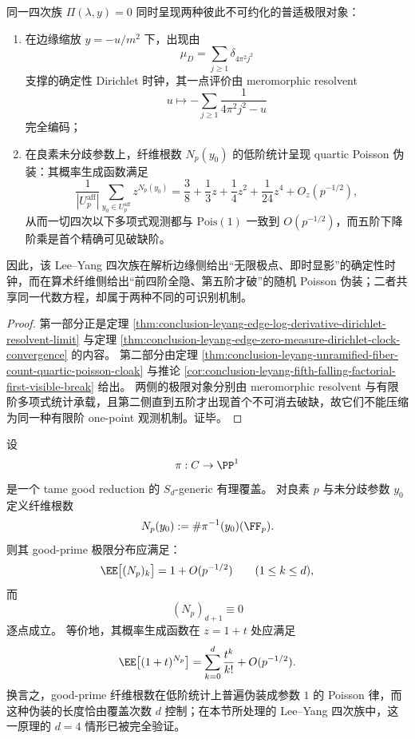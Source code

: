 \begin{theorem}\label{thm:conclusion-leyang-analytic-edge-arithmetic-fiber-dual-universality-split}
同一四次族 \(\Pi(\lambda,y)=0\) 同时呈现两种彼此不可约化的普适极限对象：
\begin{enumerate}
\item 在边缘缩放 \(y=-u/m^2\) 下，出现由
\[
\mu_D=\sum_{j\ge1}\delta_{4\pi^2j^2}
\]
支撑的确定性 Dirichlet 时钟，其一点评价由 meromorphic resolvent
\[
u\longmapsto -\sum_{j\ge1}\frac{1}{4\pi^2j^2-u}
\]
完全编码；
\item 在良素未分歧参数上，纤维根数 \(N_p(y_0)\) 的低阶统计呈现 quartic Poisson 伪装：其概率生成函数满足
\[
\frac{1}{|U_p^{\mathrm{aff}}|}\sum_{y_0\in U_p^{\mathrm{aff}}} z^{N_p(y_0)}
=
\frac38+\frac13 z+\frac14 z^2+\frac1{24}z^4+O_z(p^{-1/2}),
\]
从而一切四次以下多项式观测都与 \(\mathrm{Pois}(1)\) 一致到 \(O(p^{-1/2})\)，而五阶下降阶乘是首个精确可见破缺阶。
\end{enumerate}
因此，该 Lee--Yang 四次族在解析边缘侧给出“无限极点、即时显影”的确定性时钟，而在算术纤维侧给出“前四阶全隐、第五阶才破”的随机 Poisson 伪装；二者共享同一代数方程，却属于两种不同的可识别机制。
\end{theorem}
\begin{proof}
第一部分正是定理 \ref{thm:conclusion-leyang-edge-log-derivative-dirichlet-resolvent-limit} 与定理 \ref{thm:conclusion-leyang-edge-zero-measure-dirichlet-clock-convergence} 的内容。
第二部分由定理 \ref{thm:conclusion-leyang-unramified-fiber-count-quartic-poisson-cloak} 与推论 \ref{cor:conclusion-leyang-fifth-falling-factorial-first-visible-break} 给出。
两侧的极限对象分别由 meromorphic resolvent 与有限阶多项式统计承载，且第二侧直到五阶才出现首个不可消去破缺，故它们不能压缩为同一种有限阶 one-point 观测机制。证毕。
\end{proof}

\begin{conjecture}\label{conj:conclusion-leyang-degree-d-poisson-cloak-principle}
设
\[
\pi:C\to \PP^1
\]
是一个 tame good reduction 的 \(S_d\)-generic 有理覆盖。
对良素 \(p\) 与未分歧参数 \(y_0\) 定义纤维根数
\[
N_p(y_0):=\#\pi^{-1}(y_0)(\FF_p).
\]
则其 good-prime 极限分布应满足：
\[
\EE\bigl[(N_p)_k\bigr]=1+O(p^{-1/2})
\qquad (1\le k\le d),
\]
而
\[
(N_p)_{d+1}\equiv 0
\]
逐点成立。
等价地，其概率生成函数在 \(z=1+t\) 处应满足
\[
\EE\bigl[(1+t)^{N_p}\bigr]
=
\sum_{k=0}^{d}\frac{t^k}{k!}+O(p^{-1/2}).
\]
换言之，good-prime 纤维根数在低阶统计上普遍伪装成参数 \(1\) 的 Poisson 律，而这种伪装的长度恰由覆盖次数 \(d\) 控制；在本节所处理的 Lee--Yang 四次族中，这一原理的 \(d=4\) 情形已被完全验证。
\end{conjecture}

\endinput
